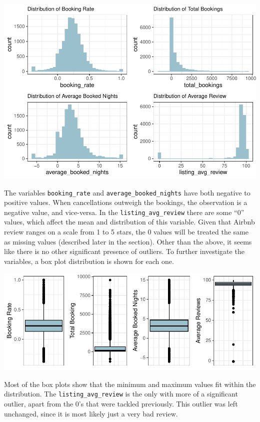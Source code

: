 \documentclass[
  12pt,
]{article}
\begin{document}
\includegraphics{Group-D---Assignment-1_files/figure-latex/unnamed-chunk-3-1.pdf}

The variables \texttt{booking\_rate} and
\texttt{average\_booked\_nights} have both negative to positive values.
When cancellations outweigh the bookings, the observation is a negative
value, and vice-versa. In the \texttt{listing\_avg\_review} there are
some ``0'' values, which affect the mean and distribution of this
variable. Given that Airbnb review ranges on a scale from 1 to 5 stars,
the 0 values will be treated the same as missing values (described later
in the section). Other than the above, it seems like there is no other
significant presence of outliers. To further investigate the variables,
a box plot distribution is shown for each one.

\includegraphics{Group-D---Assignment-1_files/figure-latex/unnamed-chunk-4-1.pdf}

Most of the box plots show that the minimum and maximum values fit
within the distribution. The \texttt{listing\_avg\_review} is the only
with more of a significant outlier, apart from the 0's that were tackled
previously. This outlier was left unchanged, since it is most likely
just a very bad review.
\end{document}
